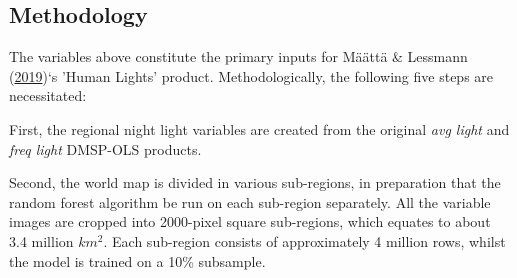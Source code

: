 \documentclass[11pt,preprint, authoryear]{elsarticle}
\numberwithin{equation}{section}
\numberwithin{figure}{section}
\numberwithin{table}{section}
\begin{document}
\hypertarget{methodology}{%
\subsection{Methodology}\label{methodology}}

The variables above constitute the primary inputs for Määttä \& Lessmann
(\protect\hyperlink{ref-maatta}{2019})`s 'Human Lights' product.
Methodologically, the following five steps are necessitated:

First, the regional night light variables are created from the original
\emph{avg light} and \emph{freq light} DMSP-OLS products.

Second, the world map is divided in various sub-regions, in preparation
that the random forest algorithm be run on each sub-region separately.
All the variable images are cropped into 2000-pixel square sub-regions,
which equates to about 3.4 million \(km^2\). Each sub-region consists of
approximately 4 million rows, whilst the model is trained on a 10\%
subsample.
\end{document}
